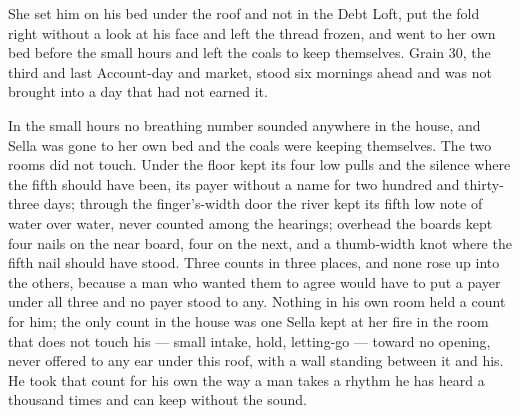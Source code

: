 She set him on his bed under the roof and not in the Debt Loft, put the fold right without a look at his face and left the thread frozen, and went to her own bed before the small hours and left the coals to keep themselves. Grain 30, the third and last Account-day and market, stood six mornings ahead and was not brought into a day that had not earned it.

In the small hours no breathing number sounded anywhere in the house, and Sella was gone to her own bed and the coals were keeping themselves. The two rooms did not touch. Under the floor  kept its four low pulls and the silence where the fifth should have been, its payer without a name for two hundred and thirty-three days; through the finger's-width door the river kept its fifth low note of water over water, never counted among the hearings; overhead the boards kept four nails on the near board, four on the next, and a thumb-width knot where the fifth nail should have stood. Three counts in three places, and none rose up into the others, because a man who wanted them to agree would have to put a payer under all three and no payer stood to any. Nothing in his own room held a count for him; the only count in the house was one Sella kept at her fire in the room that does not touch his --- small intake, hold, letting-go --- toward no opening, never offered to any ear under this roof, with a wall standing between it and his. He took that count for his own the way a man takes a rhythm he has heard a thousand times and can keep without the sound.

